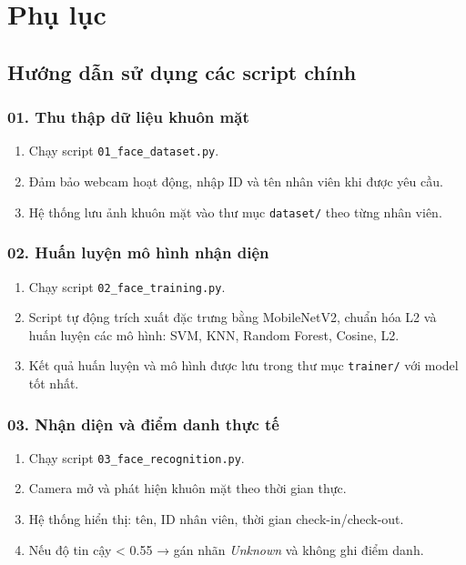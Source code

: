 \documentclass[a4paper]{book}
\begin{document}
\appendix
\chapter{Phụ lục}

\section{Hướng dẫn sử dụng các script chính}

\subsection*{01. Thu thập dữ liệu khuôn mặt}
\begin{enumerate}
    \item Chạy script \texttt{01\_face\_dataset.py}.
    \item Đảm bảo webcam hoạt động, nhập ID và tên nhân viên khi được yêu cầu.
    \item Hệ thống lưu ảnh khuôn mặt vào thư mục \texttt{dataset/} theo từng nhân viên.
\end{enumerate}

\subsection*{02. Huấn luyện mô hình nhận diện}
\begin{enumerate}
    \item Chạy script \texttt{02\_face\_training.py}.
    \item Script tự động trích xuất đặc trưng bằng MobileNetV2, chuẩn hóa L2 và huấn luyện các mô hình: SVM, KNN, Random Forest, Cosine, L2.
    \item Kết quả huấn luyện và mô hình được lưu trong thư mục \texttt{trainer/} với model tốt nhất.
\end{enumerate}

\subsection*{03. Nhận diện và điểm danh thực tế}
\begin{enumerate}
    \item Chạy script \texttt{03\_face\_recognition.py}.
    \item Camera mở và phát hiện khuôn mặt theo thời gian thực.
    \item Hệ thống hiển thị: tên, ID nhân viên, thời gian check-in/check-out.
    \item Nếu độ tin cậy < 0.55 → gán nhãn \textit{Unknown} và không ghi điểm danh.

\end{enumerate}
\end{document}
